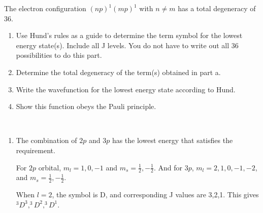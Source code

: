 \item The electron configuration $(np)^1(mp)^1$ with $n\neq m$ has a total degeneracy of 36.
\begin{enumerate}
    \item Use Hund's rules as a guide to determine the term symbol for the lowest energy state(s). Include
          all J levels. You do not have to write out all 36 possibilities to do this part.
    \item Determine the total degeneracy of the term(s) obtained in part a.
    \item Write the wavefunction for the lowest energy state according to Hund.
    \item Show this function obeys the Pauli principle.
\end{enumerate}
\begin{solution}\
    \begin{enumerate}
        \item The combination of $2p$ and $3p$ has the lowest energy that satisfies the requirement.

              For $2p$ orbital, $m_l=1,0,-1$ and $m_s=\frac{1}{2},-\frac{1}{2}$. And for $3p$, $m_l=2,1,0,-1,-2$,
              and $m_s=\frac{1}{2},-\frac{1}{2}$.

              When $l=2$, the symbol is D, and corresponding J values are 3,2,1. This gives $^3D^3,^3D^2,^3D^1$.
    \end{enumerate}
\end{solution}